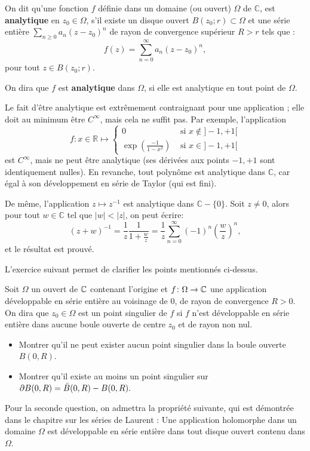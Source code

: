 \begin{fdefn}
On dit qu'une fonction $f$ définie dans un domaine (ou ouvert) $\Omega$ de $\mathbb{C}$, est \textbf{analytique} en $z_0 \in \Omega$, s'il existe un disque ouvert $B(z_0 ; r) \subset \Omega$ et une série entière
$\sum_{n \geq 0}a_n (z -z_0)^n$ de rayon de convergence supérieur $R>r$ tels que :
\[f(z) = \sum_{n =0}^\infty a_n(z-z_0)^n,\]
pour tout $z \in B(z_0 ; r)$. 

On dira que $f$ est \textbf{analytique} dans $\Omega$, si elle est analytique en tout
point de $\Omega$.
\end{fdefn}

Le fait d'être analytique est extrêmement contraignant pour une application ; elle doit au minimum être $C^\infty$, mais cela ne suffit pas. Par exemple, l'application
\[f \colon x \in \mathbb{R} \mapsto \left\{
\begin{array}{cc}
0 & \text{ si } x \notin ]-1,+1[ \\
\exp\left(\frac{-1}{1-x^2}\right) &  \text{ si } x \in ]-1,+1[
\end{array}
\right.
\]
est $C^\infty$, mais ne peut être analytique (ses dérivées aux points $-1,+1$
sont identiquement nulles).
En revanche, tout polynôme est analytique dans $\mathbb{C}$, car égal à son
développement en série de Taylor (qui est fini). 

De même, l'application $z
\mapsto z^{-1}$ est analytique dans $\mathbb{C}-\{0\}$. Soit $z \neq 0$, alors pour
tout $w \in \mathbb{C}$ tel que $|w|<|z|$, on peut écrire:
\[(z+w)^{-1}=  \frac{1}{z}\frac{1}{1+\frac{w}{z}} = \frac{1}{z} \sum_{n=0}^\infty (-1)^n \left( \frac{w}{z} \right)^n,\]
et le résultat est prouvé. 


L'exercice suivant permet de clarifier les points mentionnés ci-dessus.
\begin{exercice}
    Soit $\Omega$ un ouvert de $\mathbb{C}$ contenant l'origine et $f \colon \Omega \to \mathbb{C}$ une application développable en
    série entière au voisinage de $0$, de rayon de convergence $R > 0$. On dira que $z_0 \in \Omega$ est un point singulier de $f$ si $f$ n'est développable en série entière dans aucune boule ouverte de centre $z_0$ et de rayon non nul.
    \begin{itemize}
        \item Montrer qu'il ne peut exister aucun point singulier dans la boule ouverte $B(0,R).$
        \item Montrer qu'il existe au moins un point singulier sur $\partial B(0,R) = \Bar{B}(0,R)-B(0,R).$ 
    \end{itemize}
    Pour la seconde question, on admettra la propriété suivante, qui est démontrée dans le chapitre sur les séries de Laurent : Une application holomorphe dans un domaine $\Omega$ est développable en série entière dans tout disque ouvert contenu dans $\Omega.$ 
\end{exercice}

